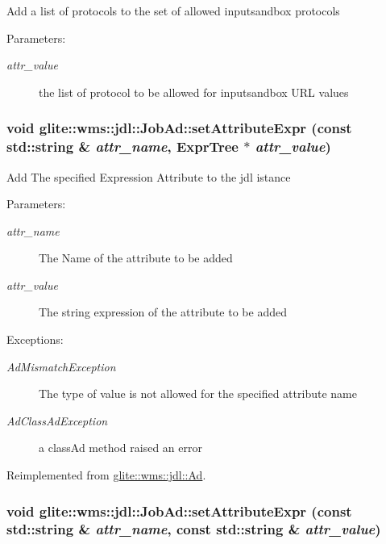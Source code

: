 Add a list of protocols to the set of allowed inputsandbox protocols \begin{Desc}
\item[Parameters:]
\begin{description}
\item[{\em attr\_\-value}]the list of protocol to be allowed for inputsandbox URL values\end{description}
\end{Desc}
\hypertarget{classglite_1_1wms_1_1jdl_1_1JobAd_z5_5}{
\subsubsection[setAttributeExpr]{\setlength{\rightskip}{0pt plus 5cm}void glite::wms::jdl::Job\-Ad::set\-Attribute\-Expr (const std::string \& {\em attr\_\-name}, Expr\-Tree $\ast$ {\em attr\_\-value})}}
\label{classglite_1_1wms_1_1jdl_1_1JobAd_z5_5}


Add The specified Expression Attribute to the jdl istance \begin{Desc}
\item[Parameters:]
\begin{description}
\item[{\em attr\_\-name}]The Name of the attribute to be added \item[{\em attr\_\-value}]The string expression of the attribute to be added \end{description}
\end{Desc}
\begin{Desc}
\item[Exceptions:]
\begin{description}
\item[{\em Ad\-Mismatch\-Exception}]The type of value is not allowed for the specified attribute name \item[{\em Ad\-Class\-Ad\-Exception}]a class\-Ad method raised an error \end{description}
\end{Desc}


Reimplemented from \hyperlink{classglite_1_1wms_1_1jdl_1_1Ad_z19_15}{glite::wms::jdl::Ad}.\hypertarget{classglite_1_1wms_1_1jdl_1_1JobAd_z5_4}{
\subsubsection[setAttributeExpr]{\setlength{\rightskip}{0pt plus 5cm}void glite::wms::jdl::Job\-Ad::set\-Attribute\-Expr (const std::string \& {\em attr\_\-name}, const std::string \& {\em attr\_\-value})}}
\label{classglite_1_1wms_1_1jdl_1_1JobAd_z5_4}


